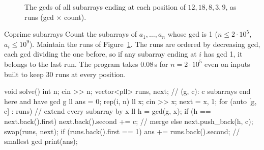 \begin{figure}[htbp]
\centering
{}
\caption{The gcds of all subarrays ending at each position of $12, 18, 8, 3, 9$, as runs (gcd $\times$ count).}
\label{fig:gcdruns}
\end{figure}

\begin{problem}{Coprime subarrays}
Count the subarrays of $a_1, \dots, a_n$ whose gcd is 1 ($n \le 2 \cdot 10^5$, $a_i \le 10^9$).
\solution Maintain the runs of Figure~\ref{fig:gcdruns}. The runs are ordered by decreasing gcd, each gcd dividing the one before, so
if any subarray ending at $i$ has gcd 1, it belongs to the last run. The program takes 0.08\,s for $n = 2 \cdot 10^5$ even on inputs
built to keep 30 runs at every position.
\end{problem}

\begin{code}
void solve() {
    int n;
    cin >> n;
    vector<pll> runs, next;  // (g, c): c subarrays end here and have gcd g
    ll ans = 0;
    rep(i, n) {
        ll x;
        cin >> x;
        next = {{x, 1}};
        for (auto [g, c] : runs) {  // extend every subarray by x
            ll h = gcd(g, x);
            if (h == next.back().first) next.back().second += c;  // merge
            else next.push_back({h, c});
        }
        swap(runs, next);
        if (runs.back().first == 1) ans += runs.back().second;  // smallest gcd
    }
    print(ans);
}
\end{code}

